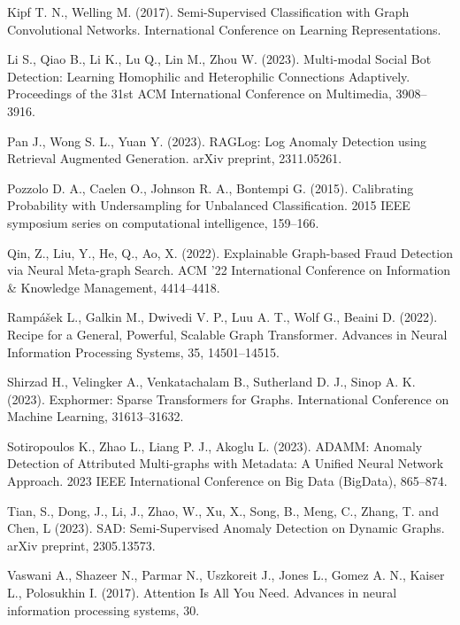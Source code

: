 \documentclass[a4paper,article,14pt]{extarticle}
\begin{document}
\begin{thebibliography}{1}
 Kipf T. N., Welling M. (2017). \flqq Semi-Supervised Classification with Graph Convolutional Networks\frqq. International Conference on Learning Representations.

 Li S., Qiao B., Li K., Lu Q., Lin M., Zhou W. (2023). \flqq Multi-modal Social Bot Detection: Learning Homophilic and Heterophilic Connections Adaptively\frqq. Proceedings of the 31st ACM International Conference on Multimedia, 3908--3916.

 Pan J., Wong S. L., Yuan Y. (2023). \flqq RAGLog: Log Anomaly Detection using Retrieval Augmented Generation\frqq. arXiv preprint, 2311.05261.

 Pozzolo D. A., Caelen O., Johnson R. A., Bontempi G. (2015). \flqq Calibrating Probability with Undersampling for Unbalanced Classification\frqq. 2015 IEEE symposium series on computational intelligence, 159--166.

 Qin, Z., Liu, Y., He, Q., Ao, X. (2022). \flqq Explainable Graph-based Fraud Detection via Neural Meta-graph Search\frqq. ACM '22 International Conference on Information \& Knowledge Management, 4414--4418.

 Rampášek L., Galkin M., Dwivedi V. P., Luu A. T., Wolf G., Beaini D. (2022). \flqq Recipe for a General, Powerful, Scalable Graph Transformer\frqq. Advances in Neural Information Processing Systems, 35, 14501--14515.

 Shirzad H., Velingker A., Venkatachalam B., Sutherland D. J., Sinop A. K. (2023). \flqq Exphormer: Sparse Transformers for Graphs\frqq. International Conference on Machine Learning, 31613--31632.

 Sotiropoulos K., Zhao L., Liang P. J.,  Akoglu L. (2023). \flqq ADAMM: Anomaly Detection of Attributed Multi-graphs with Metadata: A Unified Neural Network Approach\frqq. 2023 IEEE International Conference on Big Data (BigData), 865--874.

 Tian, S., Dong, J., Li, J., Zhao, W., Xu, X., Song, B., Meng, C., Zhang, T. and Chen, L (2023). \flqq SAD: Semi-Supervised Anomaly Detection on Dynamic Graphs\frqq. arXiv preprint, 2305.13573.

 Vaswani A., Shazeer N., Parmar N., Uszkoreit J., Jones L., Gomez A. N., Kaiser L., Polosukhin I. (2017). \flqq Attention Is All You Need\frqq. Advances in neural information processing systems, 30.


\end{thebibliography}
\end{document}
